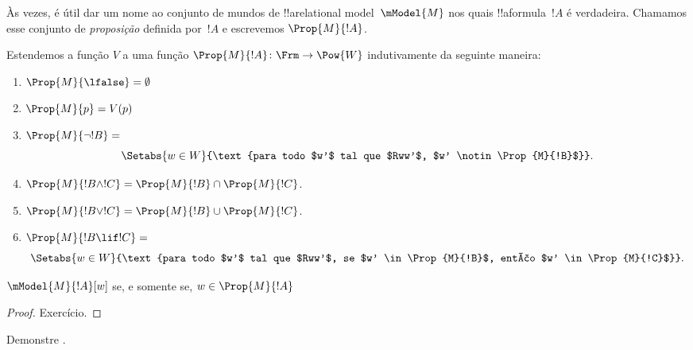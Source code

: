 \documentclass[../../../include/open-logic-section]{subfiles}
\begin{document}


Às vezes, é útil dar um nome ao conjunto de mundos de
!!a{relational model}~$\mModel{M}$ nos quais !!a{formula}~$!A$ é verdadeira.
Chamamos esse conjunto de \emph{proposição} definida por~$!A$ e escrevemos
$\Prop{M}{!A}$. 

\begin{defn}
  Estendemos a função $V$ a uma função $\Prop{M}{!A} \colon \Frm
  \to \Pow{W}$ indutivamente da seguinte maneira:
  \begin{enumerate}
  \item $\Prop{M}{\lfalse} = \emptyset$
  \item $\Prop{M}{p} = V(p)$
  \item $\Prop{M}{\lnot !B} = {}$
    \[
      \Setabs{w \in W}{\text{para todo $w'$ tal que $Rww'$, $w'
          \notin \Prop{M}{!B}$}}.
    \]
  \item $\Prop{M}{!B \land !C} = \Prop{M}{!B} \cap \Prop{M}{!C}$.
  \item $\Prop{M}{!B \lor !C} = \Prop{M}{!B} \cup \Prop{M}{!C}$.
  \item $\Prop{M}{!B \lif !C} = {}$
    \[
      \Setabs{w \in W}{\text{para todo $w'$ tal que $Rww'$, se $w'
          \in \Prop{M}{!B}$, então $w' \in \Prop{M}{!C}$}}.
    \]
  \end{enumerate}
\end{defn}

\begin{prop}
  $\mModel{M}{!A}[w]$ se, e somente se, $w \in \Prop{M}{!A}$
\end{prop}

\begin{proof}
  Exercício.
\end{proof}

\begin{prob}
  Demonstre .
\end{prob}
\end{document}
